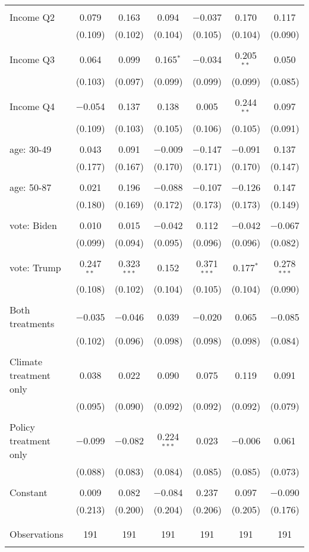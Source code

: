 \begin{tabular}{@{\extracolsep{5pt}}lcccccc}
  & & & & & & \\ 
 Income Q2 & 0.079 & 0.163 & 0.094 & $-$0.037 & 0.170 & 0.117 \\ 
  & (0.109) & (0.102) & (0.104) & (0.105) & (0.104) & (0.090) \\ 
  & & & & & & \\ 
 Income Q3 & 0.064 & 0.099 & 0.165$^{*}$ & $-$0.034 & 0.205$^{**}$ & 0.050 \\ 
  & (0.103) & (0.097) & (0.099) & (0.099) & (0.099) & (0.085) \\ 
  & & & & & & \\ 
 Income Q4 & $-$0.054 & 0.137 & 0.138 & 0.005 & 0.244$^{**}$ & 0.097 \\ 
  & (0.109) & (0.103) & (0.105) & (0.106) & (0.105) & (0.091) \\ 
  & & & & & & \\ 
 age: 30-49 & 0.043 & 0.091 & $-$0.009 & $-$0.147 & $-$0.091 & 0.137 \\ 
  & (0.177) & (0.167) & (0.170) & (0.171) & (0.170) & (0.147) \\ 
  & & & & & & \\ 
 age: 50-87 & 0.021 & 0.196 & $-$0.088 & $-$0.107 & $-$0.126 & 0.147 \\ 
  & (0.180) & (0.169) & (0.172) & (0.173) & (0.173) & (0.149) \\ 
  & & & & & & \\ 
 vote: Biden & 0.010 & 0.015 & $-$0.042 & 0.112 & $-$0.042 & $-$0.067 \\ 
  & (0.099) & (0.094) & (0.095) & (0.096) & (0.096) & (0.082) \\ 
  & & & & & & \\ 
 vote: Trump & 0.247$^{**}$ & 0.323$^{***}$ & 0.152 & 0.371$^{***}$ & 0.177$^{*}$ & 0.278$^{***}$ \\ 
  & (0.108) & (0.102) & (0.104) & (0.105) & (0.104) & (0.090) \\ 
  & & & & & & \\ 
 Both treatments & $-$0.035 & $-$0.046 & 0.039 & $-$0.020 & 0.065 & $-$0.085 \\ 
  & (0.102) & (0.096) & (0.098) & (0.098) & (0.098) & (0.084) \\ 
  & & & & & & \\ 
 Climate treatment only & 0.038 & 0.022 & 0.090 & 0.075 & 0.119 & 0.091 \\ 
  & (0.095) & (0.090) & (0.092) & (0.092) & (0.092) & (0.079) \\ 
  & & & & & & \\ 
 Policy treatment only & $-$0.099 & $-$0.082 & 0.224$^{***}$ & 0.023 & $-$0.006 & 0.061 \\ 
  & (0.088) & (0.083) & (0.084) & (0.085) & (0.085) & (0.073) \\ 
  & & & & & & \\ 
 Constant & 0.009 & 0.082 & $-$0.084 & 0.237 & 0.097 & $-$0.090 \\ 
  & (0.213) & (0.200) & (0.204) & (0.206) & (0.205) & (0.176) \\ 
  & & & & & & \\ 
\hline \\[-1.8ex] 

Observations & 191 & 191 & 191 & 191 & 191 & 191 \\ 
\hline 
\hline \\[-1.8ex] 
\end{tabular} 